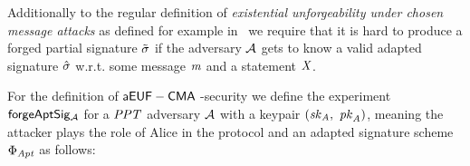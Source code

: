 \begin{definition}[$\cnstaEUFCMA$]
    \label{def:aeufcma}
    Additionally to the regular definition of \textit{existential unforgeability under chosen message attacks} as defined for example in~\cite{vaudenay2006classical} we require that it is hard to produce a forged partial signature $\tilde{\sigma}$ if the
    adversary $\mathcal{A}$ gets to know a valid adapted signature $\hat{\sigma}$ w.r.t. some message $\mathit{m}$ and a statement $\mathit{X}$.

    For the definition of $\cnstaEUFCMA$-security we define the experiment $\mathsf{forgeAptSig_{\mathcal{A}}}$ for a $\mathit{PPT}$ adversary $\mathcal{A}$ with a keypair $(\mathit{sk}_{\mathit{A}} ,~ \mathit{pk}_{\mathit{A}})$,
    meaning the attacker plays the role of Alice in the protocol and an adapted signature scheme $\Phi_{\mathit{Apt}}$ as
    follows:


\end{definition}

